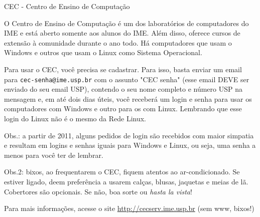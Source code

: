 \begin{secao}{CEC - Centro de Ensino de Computação}

O Centro de Ensino de Computação é um dos laboratórios de computadores do IME e
está aberto somente aos alunos do IME. Além disso, oferece cursos de extensão à
comunidade durante o ano todo. Há computadores que usam o Windows e outros que
usam o Linux como Sistema Operacional.

Para usar o CEC, você precisa se cadastrar. Para isso, basta enviar um email
para {\tt cec-senha@ime.usp.br} com o assunto "CEC senha" (esse email DEVE ser
enviado do seu email USP), contendo o seu nome completo e número USP na mensagem
e, em até dois dias úteis, você receberá um login e senha para usar os
computadores com Windows e outro para os com Linux. Lembrando que esse login do
Linux não é o mesmo da Rede Linux.

Obs.: a partir de 2011, alguns pedidos de login são recebidos com maior simpatia
e resultam em logins e senhas iguais para Windows e Linux, ou seja, uma senha a
menos para você ter de lembrar.

Obs.2: bixos, ao frequentarem o CEC, fiquem atentos ao ar-condicionado. Se
estiver ligado, deem preferência a usarem calças, blusas, jaquetas e meias de
lã. Cobertores são opcionais. Se não, boa sorte ou \textit{hasta la vista}!

Para mais informações, acesse o site \url{http://cecserv.ime.usp.br} (sem www,
bixos!)
\end{secao}
